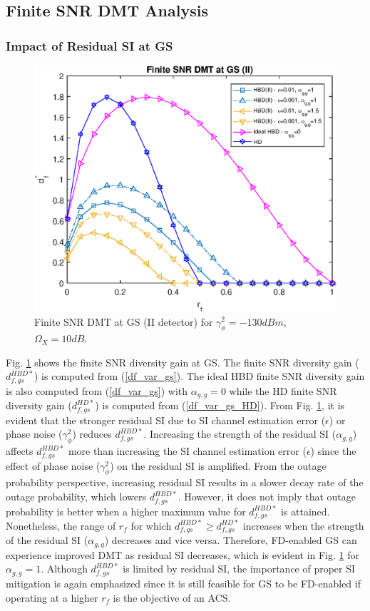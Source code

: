 \subsection{Finite SNR DMT Analysis}

\subsubsection{Impact of Residual SI at GS}

\begin{figure} []
\centering
\includegraphics [width=0.6\columnwidth]{chap4_fig/var_df_gs.eps} 
\vspace{-0.5cm}
\caption{Finite SNR DMT at GS (II detector) for $\gamma_{\phi}^2=-130dBm$, $\Omega_X=10dB$.}
\label{fig:var_df_gs}
\end{figure}

Fig. \ref{fig:var_df_gs} shows the finite SNR diversity gain at GS. The finite SNR diversity gain ($d_{f,gs}^{HBD*}$) is computed from (\ref{df_var_gs}). The ideal HBD finite SNR diversity gain is also computed from (\ref{df_var_gs}) with $\alpha_{g,g}=0$ while the HD finite SNR diversity gain ($d_{f,gs}^{HD*}$) is computed from (\ref{df_var_gs_HD}). From Fig. \ref{fig:var_df_gs}, it is evident that the stronger residual SI due to SI channel estimation error ($\epsilon$) or phase noise ($\gamma_{\phi}^2$) reduces $d_{f,gs}^{HBD*}$. Increasing the strength of the residual SI ($\alpha_{g,g}$) affects $d_{f,gs}^{HBD*}$ more than increasing the SI channel estimation error ($\epsilon$) since the effect of phase noise ($\gamma_{\phi}^2$) on the residual SI is amplified. From the outage probability perspective, increasing residual SI results in a slower decay rate of the outage probability, which lowers $d_{f,gs}^{HBD*}$. However, it does not imply that outage probability is better when a higher maximum value for $d_{f,gs}^{HBD*}$ is attained. Nonetheless, the range of $r_f$ for which $d_{f,gs}^{HBD*}\geq d_{f,gs}^{HD*}$ increases when the strength of the residual SI ($\alpha_{g,g}$) decreases and vice versa. Therefore, FD-enabled GS can experience improved DMT as residual SI decreases, which is evident in Fig. \ref{fig:var_df_gs} for $\alpha_{g,g}=1$. Although $d_{f,gs}^{HBD*}$ is limited by residual SI, the importance of proper SI mitigation is again emphasized since it is still feasible for GS to be FD-enabled if operating at a higher $r_f$ is the objective of an ACS.

